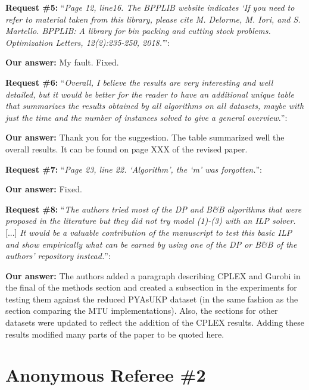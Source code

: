 \documentclass{elsarticle}
\begin{document}
\textbf{Request \#5:} ``\textit{Page 12, line16. The BPPLIB website indicates `If you need to refer to material taken from this library, please cite M. Delorme, M. Iori, and S. Martello. BPPLIB: A library for bin packing and cutting stock problems. Optimization Letters, 12(2):235-250, 2018.'}'':

\textbf{Our answer:} My fault. Fixed.
\medskip

\textbf{Request \#6:} ``\textit{Overall, I believe the results are very interesting and well detailed, but it would be better for the reader to have an additional unique table that summarizes the results obtained by all algorithms on all datasets, maybe with just the time and the number of instances solved to give a general overview.}'':

\textbf{Our answer:} Thank you for the suggestion. The table summarized well the overall results. It can be found on page XXX of the revised paper.
\medskip

\textbf{Request \#7:} ``\textit{Page 23, line 22. `Algorithm', the `m' was forgotten.}'':

\textbf{Our answer:} Fixed.
\medskip

\textbf{Request \#8:} ``\textit{The authors tried most of the DP and B\&B algorithms that were proposed in the literature but they did not try model (1)-(3) with an ILP solver.} [...] \textit{It would be a valuable contribution of the manuscript to test this basic ILP and show empirically what can be earned by using one of the DP or B\&B of the authors' repository instead.}'':

\textbf{Our answer:} The authors added a paragraph describing CPLEX and Gurobi in the final of the methods section and created a subsection in the experiments for testing them against the reduced PYAsUKP dataset (in the same fashion as the section comparing the MTU implementations). Also, the sections for other datasets were updated to reflect the addition of the CPLEX results. Adding these results modified many parts of the paper to be quoted here.
\medskip

\section{Anonymous Referee \#2}
\end{document}
